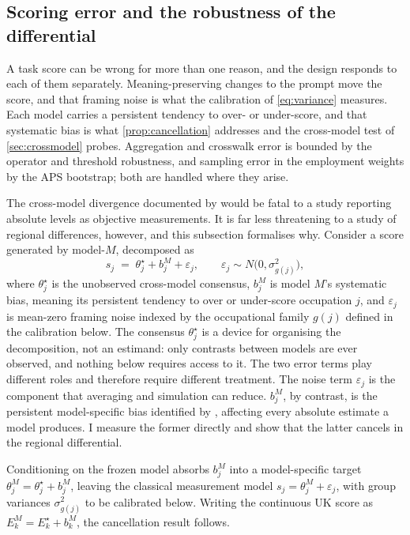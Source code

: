 \subsection{Scoring error and the robustness of the differential}\label{sec:noise}

A task score can be wrong for more than one reason, and the design responds to each of them separately. Meaning-preserving changes to the prompt move the score, and that framing noise is what the calibration of \cref{eq:variance} measures. Each model carries a persistent tendency to over- or under-score, and that systematic bias \citep{yin2026} is what \cref{prop:cancellation} addresses and the cross-model test of \cref{sec:crossmodel} probes. Aggregation and crosswalk error is bounded by the operator and threshold robustness, and sampling error in the employment weights by the APS bootstrap; both are handled where they arise.

The cross-model divergence documented by \citet{yin2026} would be fatal to a study reporting absolute levels as objective measurements. It is far less threatening to a study of regional differences, however, and this subsection formalises why. Consider a score generated by model-$M$, decomposed as
\begin{equation}\label{eq:decomposition}
s_j \;=\; \theta^{\star}_j + b^{M}_j + \varepsilon_j,
\qquad
\varepsilon_j \sim N\bigl(0, \sigma^2_{g(j)}\bigr),
\end{equation}
where $\theta^{\star}_j$ is the unobserved cross-model consensus, $b^{M}_j$ is model $M$'s systematic bias, meaning its persistent tendency to over or under-score occupation $j$, and $\varepsilon_j$ is mean-zero framing noise indexed by the occupational family $g(j)$ defined in the calibration below. The consensus $\theta^{\star}_j$ is a device for organising the decomposition, not an estimand: only contrasts between models are ever observed, and nothing below requires access to it. The two error terms play different roles and therefore require different treatment. The noise term $\varepsilon_j$ is the component that averaging and simulation can reduce. $b^{M}_j$, by contrast, is the persistent model-specific bias identified by \citet{yin2026}, affecting every absolute estimate a model produces. I measure the former directly and show that the latter cancels in the regional differential.

Conditioning on the frozen model absorbs $b^{M}_j$ into a model-specific target $\theta^{M}_j = \theta^{\star}_j + b^{M}_j$, leaving the classical measurement model $s_j = \theta^{M}_j + \varepsilon_j$, with group variances $\sigma^2_{g(j)}$ to be calibrated below. Writing the continuous UK score as $E^{M}_k = E^{\star}_k + b^{M}_k$, the cancellation result follows.

